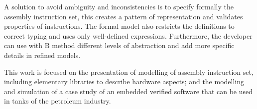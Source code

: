 \documentclass[a4paper]{llncs}
\begin{document}
A solution to avoid ambiguity and inconsistencies is to specify formally the
assembly instruction set, this creates a pattern of representation and validates
properties of instructions. The formal model also restricts the definitions to
correct typing and uses only well-defined expressions. Furthermore, the developer
can use with B method different levels of abstraction and add more specific details
in refined models.
 


This work is focused on the presentation of modelling of assembly instruction
set, including elementary libraries to describe hardware aspects; and the
modelling and simulation of a case study of an embedded verified software that
can be used in tanks of the petroleum industry.   
\end{document}
